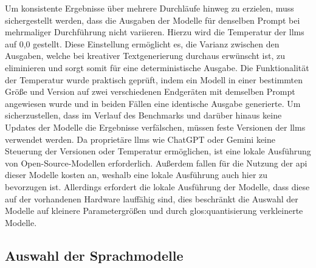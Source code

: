 Um konsistente Ergebnisse über mehrere Durchläufe hinweg zu erzielen, muss sichergestellt werden, dass die Ausgaben der Modelle für denselben Prompt bei mehrmaliger Durchführung nicht variieren.
Hierzu wird die Temperatur der \glspl{llm} auf 0,0 gestellt.
Diese Einstellung ermöglicht es, die Varianz zwischen den Ausgaben, welche bei kreativer Textgenerierung durchaus erwünscht ist, zu eliminieren und sorgt somit für eine deterministische Ausgabe.
Die Funktionalität der Temperatur wurde praktisch geprüft, indem ein Modell in einer bestimmten Größe und Version auf zwei verschiedenen Endgeräten mit demselben Prompt angewiesen wurde und in beiden Fällen eine identische Ausgabe generierte.
Um sicherzustellen, dass im Verlauf des Benchmarks und darüber hinaus keine Updates der Modelle die Ergebnisse verfälschen, müssen feste Versionen der \glspl{llm} verwendet werden.
Da proprietäre \glspl{llm} wie ChatGPT oder Gemini keine Steuerung der Versionen oder Temperatur ermöglichen, ist eine lokale Ausführung von Open-Source-Modellen erforderlich.
Außerdem fallen für die Nutzung der \gls{api} dieser Modelle kosten an, weshalb eine lokale Ausführung auch hier zu bevorzugen ist.
Allerdings erfordert die lokale Ausführung der Modelle, dass diese auf der vorhandenen Hardware lauffähig sind, dies beschränkt die Auswahl der Modelle auf kleinere Parametergrößen und durch \gls{glos:quantisierung} verkleinerte Modelle.


\subsection{Auswahl der Sprachmodelle}\label{sec:modelle-benchmark}

